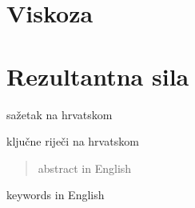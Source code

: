\documentclass[diplomskirad]{fer}
\begin{document}
    \section{Viskoza}\label{sec:viskoza}


    \section{Rezultantna sila}\label{sec:rezultantna-sila}


    
    \begin{sazetak}
        sažetak na hrvatskom
    \end{sazetak}
    \begin{kljucnerijeci}
        ključne riječi na hrvatskom
    \end{kljucnerijeci}
    \begin{abstract}
        abstract in English
    \end{abstract}
    \begin{keywords}
        keywords in English
    \end{keywords}
\end{document}
